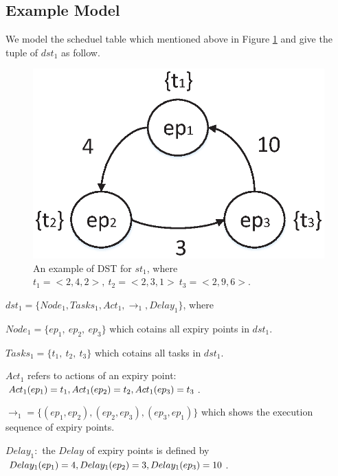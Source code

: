 \documentclass[sigconf]{acmart}
\begin{document}
\subsection{Example Model}\label{section_dst_1}
We model the scheduel table which mentioned above in Figure \ref{figure_dst1} and give the tuple of $dst_1$ as follow.
\begin{figure}
  \centering
  \includegraphics[scale=.45]{graphics/figure_dst1.eps}
  \caption{An example of DST for $st_1$, where $t_1=<2,4,2>,\ t_2=<2,3,1>\ t_3=<2,9,6>$.}
  \label{figure_dst1}
\end{figure}

$dst_1=\{Node_1,Tasks_1,Act_1,\rightarrow_1,Delay_1\}$, where 
\begin{compactitem}
\item $Node_1=\{ep_1,\ ep_2,\ ep_3\}$ which cotains all expiry points in $dst_1$.
\item $Tasks_1=\{t_1,\ t_2,\ t_3\}$ which cotains all tasks in $dst_1$.
\item $Act_1$ refers to actions of an expiry point:$\\Act_1(ep_1)=t_1,\\Act_1(ep_2)=t_2,\\Act_1(ep_3)=t_3$.
\item $\rightarrow_1=\{(ep_1,ep_2),(ep_2,ep_3),(ep_3,ep_1)\}$ which shows the execution sequence of expiry points.
\item $Delay_1:$ the $Delay$ of expiry points is defined by $\\Delay_1(ep_1)=4,\\ Delay_1(ep_2)=3,\\ Delay_1(ep_3)=10$.
\end{compactitem}
\end{document}

